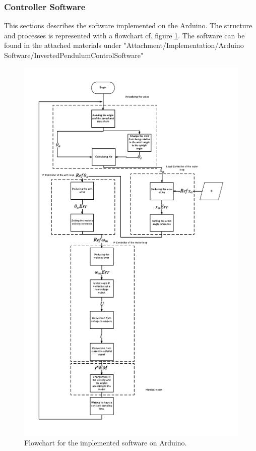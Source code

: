 \subsubsection{Controller Software}
This sections describes the software implemented on the Arduino. The structure and processes is represented with a flowchart cf. figure \ref{fig:Flowchart}. The software can be found in the attached materials under "Attachment/Implementation/Arduino Software/InvertedPendulumControlSoftware"  
\begin{figure}[htbp]
\centering
\includegraphics[width=1\linewidth]{figures/Flowchart.pdf}
\caption{Flowchart for the implemented software on Arduino.}
\label{fig:Flowchart}
\end{figure}
\newpage

